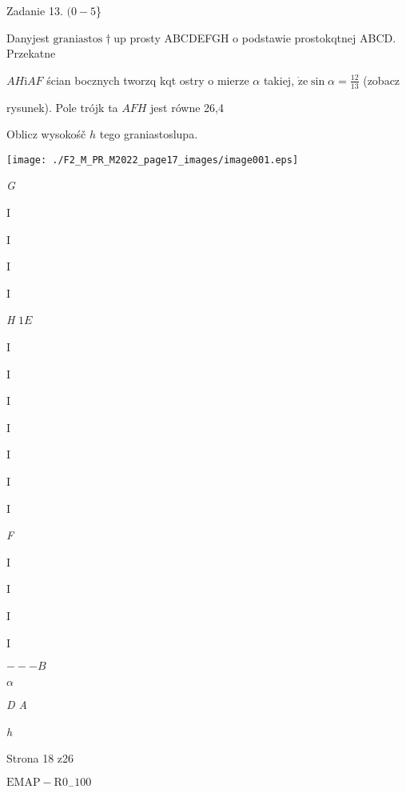 \documentclass[a4paper,12pt]{article}
\begin{document}
Zadanie 13. $(0-5$\}

Danyjest $\mathrm{g}\mathrm{r}\mathrm{a}\mathrm{n}\mathrm{i}\mathrm{a}\mathrm{s}\mathrm{t}\mathrm{o}\mathrm{s}\dagger \mathrm{u}\mathrm{p}$ prosty ABCDEFGH o podstawie prostokqtnej ABCD. Przekatne

$AH \mathrm{i} AF$ ścian bocznych tworzq kqt ostry o mierze $\alpha$ takiej, $\dot{\mathrm{z}}\mathrm{e} \displaystyle \sin\alpha=\frac{12}{13}$ (zobacz

rysunek). Pole trójk ta $AFH$ jest równe 26,4

Oblicz wysokośč $h$ tego graniastoslupa.
\begin{center}
\texttt{[image: ./F2\_M\_PR\_M2022\_page17\_images/image001.eps]}
\end{center}
{\it G}

I

I

I

I

{\it H} $1 E$

I

I

I

I

I

I

I

{\it F}

I

I

I

I

$--- B$

$\alpha$

{\it D  A}

{\it h}

Strona 18 z26

$\mathrm{E}\mathrm{M}\mathrm{A}\mathrm{P}-\mathrm{R}0_{-}100$
\end{document}
